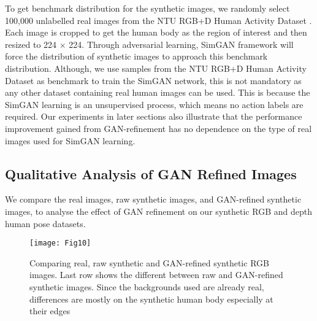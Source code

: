 \documentclass[twocolumn]{svjour3}          \smartqed  \usepackage{graphicx}
\begin{document}
To get benchmark distribution for the synthetic images, we randomly select 100,000 unlabelled real images from the NTU RGB+D Human Activity Dataset \citep{shahroudy2016ntu}. Each image is cropped to get the human body as the region of interest and then resized to 224 $\times$ 224. Through adversarial learning, SimGAN framework \citep{shrivastava2016learning} will force the distribution of synthetic images to approach this benchmark distribution. Although, we use samples from the NTU RGB+D Human Activity Dataset as benchmark to train the SimGAN network, this is not mandatory as any other dataset containing real human images can be used. This is because the SimGAN learning is an unsupervised process, which means no action labels are required. Our experiments in later sections also illustrate that the performance improvement gained from GAN-refinement has no dependence on the type of real images used for SimGAN learning.


\subsection{Qualitative Analysis of GAN Refined Images} 
\label{section:GAN_analysis}

We compare the real images, raw synthetic images, and GAN-refined synthetic images, to analyse the effect of GAN refinement on our synthetic RGB and depth human pose datasets.

\begin{figure}[t]
\centering
\texttt{[image: Fig10]}
\caption{Comparing real, raw synthetic and GAN-refined synthetic RGB images. Last row shows the different between raw and GAN-refined synthetic images. Since the backgrounds used are already real, differences are mostly on the synthetic human body especially at their edges}
\label{fig:rgb_GAN_compare}
\vspace{-1mm}
\end{figure}
\end{document}
